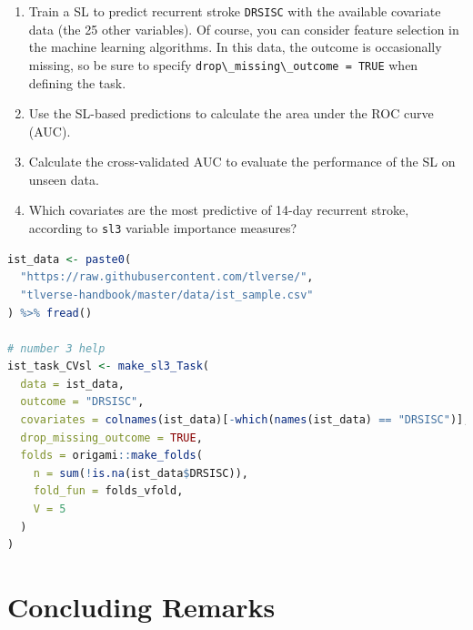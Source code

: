 \documentclass[12pt, krantz2,]{krantz}
\newcommand{\passthrough}[1]{#1}
\providecommand{\tightlist}{%
  \setlength{\itemsep}{0pt}\setlength{\parskip}{0pt}}
\theoremstyle{definition}
\theoremstyle{definition}
\theoremstyle{definition}
\newcommand{\1}{\mathbbm{1}}
\begin{document}
\begin{enumerate}
\def\labelenumi{\arabic{enumi}.}
\tightlist
\item
  Train a SL to predict recurrent stroke \passthrough{\lstinline!DRSISC!} with the available covariate
  data (the 25 other variables). Of course, you can consider feature selection
  in the machine learning algorithms. In this data, the outcome is
  occasionally missing, so be sure to specify \passthrough{\lstinline!drop\_missing\_outcome = TRUE!}
  when defining the task.
\item
  Use the SL-based predictions to calculate the area under the ROC curve
  (AUC).
\item
  Calculate the cross-validated AUC to evaluate the performance of the
  SL on unseen data.
\item
  Which covariates are the most predictive of 14-day recurrent stroke,
  according to \passthrough{\lstinline!sl3!} variable importance measures?
\end{enumerate}

\begin{lstlisting}[language=R]
ist_data <- paste0(
  "https://raw.githubusercontent.com/tlverse/",
  "tlverse-handbook/master/data/ist_sample.csv"
) %>% fread()

# number 3 help
ist_task_CVsl <- make_sl3_Task(
  data = ist_data,
  outcome = "DRSISC",
  covariates = colnames(ist_data)[-which(names(ist_data) == "DRSISC")],
  drop_missing_outcome = TRUE,
  folds = origami::make_folds(
    n = sum(!is.na(ist_data$DRSISC)),
    fold_fun = folds_vfold,
    V = 5
  )
)
\end{lstlisting}

\hypertarget{concluding-remarks}{%
\section{Concluding Remarks}\label{concluding-remarks}}
\end{document}
